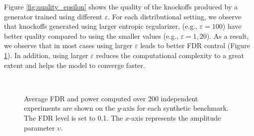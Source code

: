 \documentclass{article}
\theoremstyle{definition}
\begin{document}
Figure \ref{fig:quality_epsilon} shows the quality of the knockoffs produced by a generator trained using different $\varepsilon$. For each distributional setting, we observe that knockoffs generated using larger entropic regularizer, (e.g., $\varepsilon = 100$) have better quality compared to using the smaller values (e.g., $\varepsilon= 1, 20$). As a result, we observe that in most cases using larger $\varepsilon$ leads to better FDR control (Figure \ref{fig:fdr_epsilon}). In addition, using larger $\varepsilon$ reduces the computational complexity to a great extent and helps the model  to converge faster.
\begin{figure}[H]
\centering
  \quad
  \\
    \quad
  \caption{Average FDR and power computed over 200 independent experiments are shown on the $y$-axis  for each synthetic benchmark. The FDR level is set to 0.1.  The $x$-axis represents the amplitude parameter $\upsilon$.}
    \label{fig:fdr_epsilon}
    \vspace{-6mm}
\end{figure}
\end{document}
